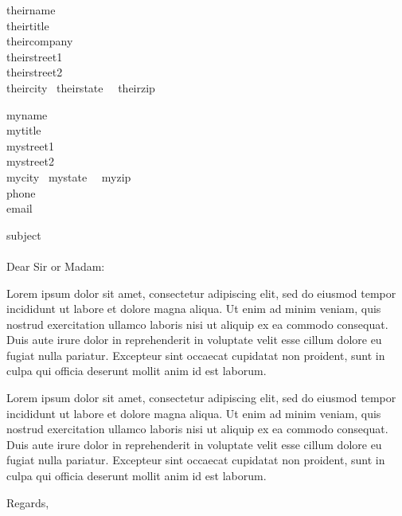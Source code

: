 \documentclass[11pt]{letter} %
\begin{document}
\begin{letter}{
theirname \\
theirtitle \\
theircompany \\
theirstreet1 \\
theirstreet2 \\
theircity~ theirstate~~ theirzip
}

myname \\
mytitle \\
mystreet1 \\
mystreet2 \\
mycity~ mystate~~ myzip \\
phone \\
email

\signature{myname}

\opening{subject \\ \\ Dear Sir or Madam:}

Lorem ipsum dolor sit amet, consectetur adipiscing elit, sed do eiusmod tempor incididunt ut labore et dolore magna aliqua. Ut enim ad minim veniam, quis nostrud exercitation ullamco laboris nisi ut aliquip ex ea commodo consequat. Duis aute irure dolor in reprehenderit in voluptate velit esse cillum dolore eu fugiat nulla pariatur. Excepteur sint occaecat cupidatat non proident, sunt in culpa qui officia deserunt mollit anim id est laborum.

Lorem ipsum dolor sit amet, consectetur adipiscing elit, sed do eiusmod tempor incididunt ut labore et dolore magna aliqua. Ut enim ad minim veniam, quis nostrud exercitation ullamco laboris nisi ut aliquip ex ea commodo consequat. Duis aute irure dolor in reprehenderit in voluptate velit esse cillum dolore eu fugiat nulla pariatur. Excepteur sint occaecat cupidatat non proident, sunt in culpa qui officia deserunt mollit anim id est laborum.

\closing{Regards,}


\end{letter}
\end{document}
